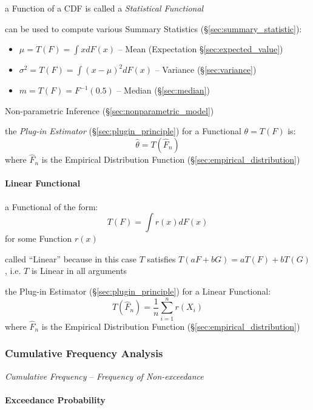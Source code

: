 a Function of a CDF is called a \emph{Statistical Functional}

can be used to compute various Summary Statistics
(\S\ref{sec:summary_statistic}):
\begin{itemize}
  \item $\mu = T(F) = \int x dF(x)$
    -- Mean (Expectation \S\ref{sec:expected_value})
  \item $\sigma^2 = T(F) = \int (x - \mu)^2 dF(x)$
    -- Variance (\S\ref{sec:variance})
  \item $m = T(F) = F^{-1}(0.5)$
    -- Median (\S\ref{sec:median})
\end{itemize}

Non-parametric Inference (\S\ref{sec:nonparametric_model})

the \emph{Plug-in Estimator} (\S\ref{sec:plugin_principle}) for a Functional
$\theta = T(F)$ is:
\[
  \hat{\theta} = T(\hat{F}_n)
\]
where $\hat{F}_n$ is the Empirical Distribution Function
(\S\ref{sec:empirical_distribution})



\paragraph{Linear Functional}\label{sec:linear_functional}\hfill

a Functional of the form:
\[
  T(F) = \int r(x) dF(x)
\]
for some Function $r(x)$

called ``Linear'' because in this case $T$ satisfies
$T(aF + bG) = aT(F) + bT(G)$, i.e. $T$ is Linear in all arguments

the Plug-in Estimator (\S\ref{sec:plugin_principle}) for a Linear Functional:
\[
  T(\hat{F}_n) = \frac{1}{n}\sum_{i=1}^n r(X_i)
\]
where $\hat{F}_n$ is the Empirical Distribution Function
(\S\ref{sec:empirical_distribution})



\subsubsection{Cumulative Frequency Analysis}
\label{sec:cumulative_frequency_analysis}

\emph{Cumulative Frequency} -- \emph{Frequency of Non-exceedance}



\paragraph{Exceedance Probability}\label{sec:exceedance_probability}\hfill

